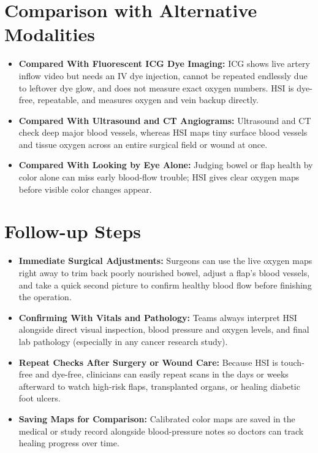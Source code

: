 \section{Comparison with Alternative Modalities}
\begin{itemize}
    \item \textbf{Compared With Fluorescent ICG Dye Imaging:} ICG shows live artery inflow video but needs an IV dye injection, cannot be repeated endlessly due to leftover dye glow, and does not measure exact oxygen numbers. HSI is dye-free, repeatable, and measures oxygen and vein backup directly.
    \item \textbf{Compared With Ultrasound and CT Angiograms:} Ultrasound and CT check deep major blood vessels, whereas HSI maps tiny surface blood vessels and tissue oxygen across an entire surgical field or wound at once.
    \item \textbf{Compared With Looking by Eye Alone:} Judging bowel or flap health by color alone can miss early blood-flow trouble; HSI gives clear oxygen maps before visible color changes appear.
\end{itemize}

\section{Follow-up Steps}
\begin{itemize}
    \item \textbf{Immediate Surgical Adjustments:} Surgeons can use the live oxygen maps right away to trim back poorly nourished bowel, adjust a flap's blood vessels, and take a quick second picture to confirm healthy blood flow before finishing the operation.
    \item \textbf{Confirming With Vitals and Pathology:} Teams always interpret HSI alongside direct visual inspection, blood pressure and oxygen levels, and final lab pathology (especially in any cancer research study).
    \item \textbf{Repeat Checks After Surgery or Wound Care:} Because HSI is touch-free and dye-free, clinicians can easily repeat scans in the days or weeks afterward to watch high-risk flaps, transplanted organs, or healing diabetic foot ulcers.
    \item \textbf{Saving Maps for Comparison:} Calibrated color maps are saved in the medical or study record alongside blood-pressure notes so doctors can track healing progress over time.
\end{itemize}

